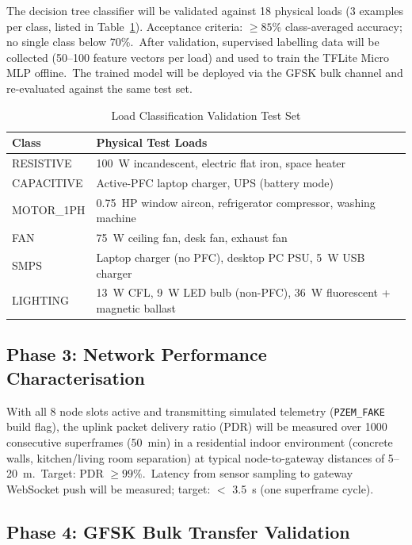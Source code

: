 \documentclass[conference]{IEEEtran}
\begin{document}
The decision tree classifier will be validated against 18 physical
loads (3 examples per class, listed in Table~\ref{tab:testloads}).
Acceptance criteria: \(\ge 85\%\) class-averaged accuracy; no single
class below 70\%.\ After validation, supervised labelling data will be
collected (50--100 feature vectors per load) and used to train the
TFLite Micro MLP offline.\ The trained model will be deployed via the
GFSK bulk channel and re-evaluated against the same test set.

\begin{table}[t]
  \caption{Load Classification Validation Test Set}
  \label{tab:testloads}
  \centering
  \small
  \begin{tabular}{lp{5.2cm}}
    \toprule
    Class & Physical Test Loads \\
    \midrule
    RESISTIVE  & 100~W incandescent, electric flat iron, space heater \\
    CAPACITIVE & Active-PFC laptop charger, UPS (battery mode) \\
    MOTOR\_1PH & 0.75~HP window aircon, refrigerator compressor,
                  washing machine \\
    FAN        & 75~W ceiling fan, desk fan, exhaust fan \\
    SMPS       & Laptop charger (no PFC), desktop PC PSU, 5~W USB charger \\
    LIGHTING   & 13~W CFL, 9~W LED bulb (non-PFC),
                  36~W fluorescent + magnetic ballast \\
    \bottomrule
  \end{tabular}
\end{table}

\subsection{Phase 3: Network Performance Characterisation}

With all 8 node slots active and transmitting simulated telemetry
(\texttt{PZEM\_FAKE} build flag), the uplink packet delivery ratio
(PDR) will be measured over 1000 consecutive superframes (50~min) in
a residential indoor environment (concrete walls, kitchen/living room
separation) at typical node-to-gateway distances of 5--20~m.\ Target:
PDR \(\ge 99\%\).\ Latency from sensor sampling to gateway WebSocket
push will be measured; target: \(<\) 3.5~s (one superframe cycle).

\subsection{Phase 4: GFSK Bulk Transfer Validation}
\end{document}
